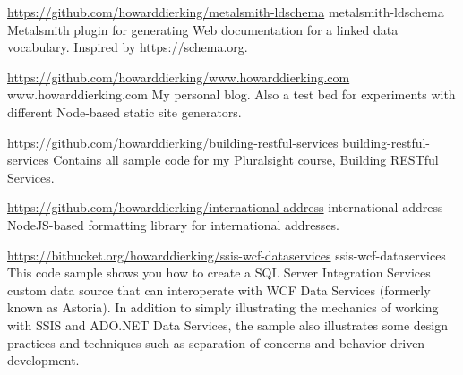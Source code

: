 


\begin{cventries}


\cventry
{\url{https://github.com/howarddierking/metalsmith-ldschema}}  %
{metalsmith-ldschema}  %
{\enskip} %
{\enskip} %
{
  Metalsmith plugin for generating Web documentation for a linked data vocabulary. Inspired by https://schema.org.
}


\cventry
{\url{https://github.com/howarddierking/www.howarddierking.com}}  %
{www.howarddierking.com}  %
{\enskip} %
{\enskip} %
{
  My personal blog. Also a test bed for experiments with different Node-based static site generators.
}


\cventry
{\url{https://github.com/howarddierking/building-restful-services}}  %
{building-restful-services}  %
{\enskip} %
{\enskip} %
{
  Contains all sample code for my Pluralsight course, Building RESTful Services.
}


\cventry
{\url{https://github.com/howarddierking/international-address}}  %
{international-address}  %
{\enskip} %
{\enskip} %
{
  NodeJS-based formatting library for international addresses.
}


\cventry
{\url{https://bitbucket.org/howarddierking/ssis-wcf-dataservices}}  %
{ssis-wcf-dataservices}  %
{\enskip} %
{\enskip} %
{
  This code sample shows you how to create a SQL Server Integration Services custom data source that can interoperate with WCF Data Services (formerly known as Astoria). In addition to simply illustrating the mechanics of working with SSIS and ADO.NET Data Services, the sample also illustrates some design practices and techniques such as separation of concerns and behavior-driven development.
}


\end{cventries}
